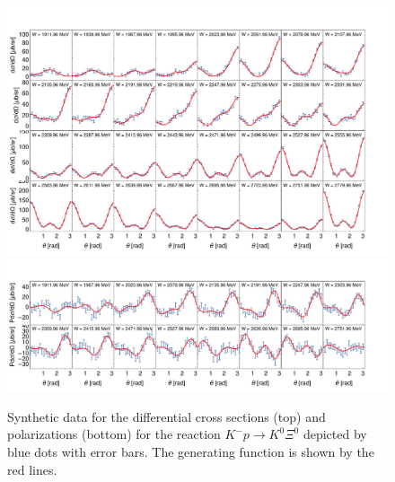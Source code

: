 \documentclass[10pt,aps,prc,superscriptaddress,twoside,twocolumn,nofootinbib,showpacs,preprintnumbers]{revtex4-1}
\begin{document}
\begin{figure}
\centering
\includegraphics[width=0.99\linewidth, trim=0.5cm 1cm 1.5cm 1cm]{DiffCS-synth-2.pdf}
\includegraphics[width=0.99\linewidth, trim=0.5cm 0.5cm 1.5cm 0cm]{pDiffCS-synth-2.pdf}
\caption{Synthetic data for the differential cross sections (top) and polarizations (bottom) for the reaction $K^-p\to K^0\Xi^0$ depicted by blue dots with error bars. The generating function is shown by the red lines.
\label{fig:Fig32}}
\end{figure}


\end{document}

